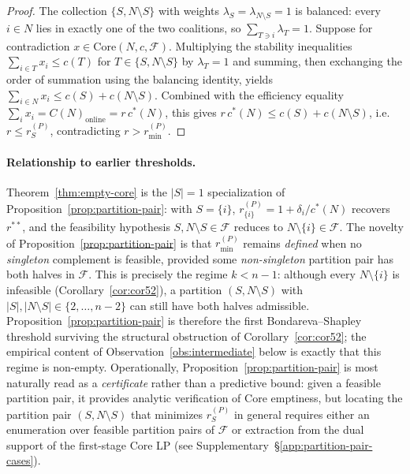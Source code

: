 \documentclass[11pt]{article}
\theoremstyle{plain}
\theoremstyle{definition}
\theoremstyle{remark}
\newcommand{\F}{\mathcal{F}}
\newcommand{\cstar}{c^{\ast}}
\begin{document}
\begin{proof}
The collection $\{S,N\setminus S\}$ with weights $\lambda_S=\lambda_{N\setminus S}=1$ is balanced: every $i\in N$ lies in exactly one of the two coalitions, so $\sum_{T\ni i}\lambda_T=1$. Suppose for contradiction $x\in\mathrm{Core}(N,c,\F)$. Multiplying the stability inequalities $\sum_{i\in T} x_i\le c(T)$ for $T\in\{S,N\setminus S\}$ by $\lambda_T=1$ and summing, then exchanging the order of summation using the balancing identity, yields $\sum_{i\in N} x_i \le c(S)+c(N\setminus S)$. Combined with the efficiency equality $\sum_i x_i = C(N)_{\text{online}} = r\,\cstar(N)$, this gives $r\,\cstar(N)\le c(S)+c(N\setminus S)$, i.e.\ $r\le r^{(P)}_{S}$, contradicting $r>r^{(P)}_{\min}$.
\end{proof}

\paragraph{Relationship to earlier thresholds.} Theorem~\ref{thm:empty-core} is the $|S|=1$ specialization of Proposition~\ref{prop:partition-pair}: with $S=\{i\}$, $r^{(P)}_{\{i\}} = 1+\delta_i/\cstar(N)$ recovers $r^{\ast\ast}$, and the feasibility hypothesis $S,N\setminus S\in\F$ reduces to $N\setminus\{i\}\in\F$. The novelty of Proposition~\ref{prop:partition-pair} is that $r^{(P)}_{\min}$ remains \emph{defined} when no \emph{singleton} complement is feasible, provided some \emph{non-singleton} partition pair has both halves in $\F$. This is precisely the regime $k<n-1$: although every $N\setminus\{i\}$ is infeasible (Corollary~\ref{cor:cor52}), a partition $(S,N\setminus S)$ with $|S|,|N\setminus S|\in\{2,\ldots,n-2\}$ can still have both halves admissible. Proposition~\ref{prop:partition-pair} is therefore the first Bondareva--Shapley threshold surviving the structural obstruction of Corollary~\ref{cor:cor52}; the empirical content of Observation~\ref{obs:intermediate} below is exactly that this regime is non-empty. Operationally, Proposition~\ref{prop:partition-pair} is most naturally read as a \emph{certificate} rather than a predictive bound: given a feasible partition pair, it provides analytic verification of Core emptiness, but locating the partition pair $(S,N\setminus S)$ that minimizes $r^{(P)}_S$ in general requires either an enumeration over feasible partition pairs of $\F$ or extraction from the dual support of the first-stage Core LP (see Supplementary~\S\ref{app:partition-pair-cases}).
\end{document}
